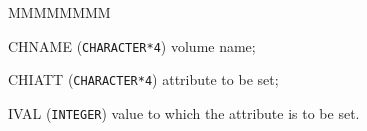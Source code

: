            
           


 
\begin{DLtt}{MMMMMMMM}
\item [CHNAME] ({\tt CHARACTER*4}) volume name;
\item[CHIATT] ({\tt CHARACTER*4}) attribute to be set;
\item[IVAL] ({\tt INTEGER}) value to which the attribute is to be set.
\end{DLtt}


